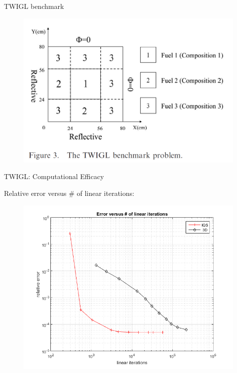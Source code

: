 \documentclass[8pt]{beamer}
\begin{document}
\begin{frame}{TWIGL benchmark}

\begin{figure}[h]
\includegraphics[width=\linewidth]{figures/twigl_geom.png}
\label{fig:IQS}
\end{figure}

\end{frame}

\begin{frame}{TWIGL:  Computational Efficacy}

Relative error versus \# of linear iterations:
\begin{figure}[h]
\includegraphics[width=0.9\linewidth]{figures/twigl_convergence_iqs.png}
\label{fig:IQS}
\end{figure}

\end{frame}
\end{document}

